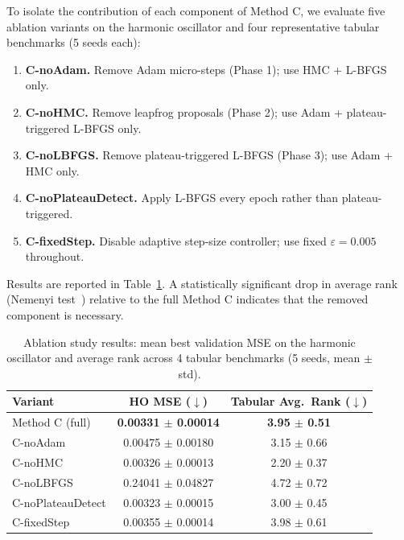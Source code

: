 \documentclass[11pt]{article}
\begin{document}
To isolate the contribution of each component of Method C, we evaluate five ablation variants on the harmonic oscillator and four representative tabular benchmarks (5 seeds each):

\begin{enumerate}

  \item[\textbf{Abl-1.}] \textbf{C-noAdam.} Remove Adam micro-steps (Phase 1); use HMC + L-BFGS only.

  \item[\textbf{Abl-2.}] \textbf{C-noHMC.} Remove leapfrog proposals (Phase 2); use Adam + plateau-triggered L-BFGS only.

  \item[\textbf{Abl-3.}] \textbf{C-noLBFGS.} Remove plateau-triggered L-BFGS (Phase 3); use Adam + HMC only.

  \item[\textbf{Abl-4.}] \textbf{C-noPlateauDetect.} Apply L-BFGS every epoch rather than plateau-triggered.

  \item[\textbf{Abl-5.}] \textbf{C-fixedStep.} Disable adaptive step-size controller; use fixed $\varepsilon=0.005$ throughout.

\end{enumerate}

Results are reported in Table~\ref{tab:ablation}. A statistically significant drop in average rank (Nemenyi test~\cite{demsar2006}) relative to the full Method C indicates that the removed component is necessary.

\begin{table}[H]
\centering
\caption{Ablation study results: mean best validation MSE on the harmonic oscillator and average rank across 4 tabular benchmarks (5 seeds, mean $\pm$ std).}
\label{tab:ablation}
\renewcommand{\arraystretch}{1.25}
\begin{tabular}{lcc}
\toprule
\textbf{Variant} & \textbf{HO MSE} ($\downarrow$)
                 & \textbf{Tabular Avg.\ Rank} ($\downarrow$) \\
\midrule
Method C (full)         & \textbf{0.00331 $\pm$ 0.00014} & \textbf{3.95 $\pm$ 0.51} \\
C-noAdam                & 0.00475 $\pm$ 0.00180 & 3.15 $\pm$ 0.66 \\
C-noHMC                 & 0.00326 $\pm$ 0.00013 & 2.20 $\pm$ 0.37 \\
C-noLBFGS               & 0.24041 $\pm$ 0.04827 & 4.72 $\pm$ 0.72 \\
C-noPlateauDetect       & 0.00323 $\pm$ 0.00015 & 3.00 $\pm$ 0.45 \\
C-fixedStep             & 0.00355 $\pm$ 0.00014 & 3.98 $\pm$ 0.61 \\
\bottomrule
\end{tabular}
\end{table}
\end{document}
